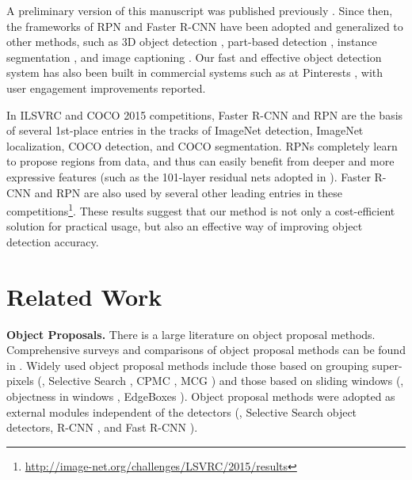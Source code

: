 \documentclass[10pt,journal,cspaper,compsoc]{IEEEtran}
\begin{document}
A preliminary version of this manuscript was published previously \cite{Ren2015a}. Since then, the frameworks of RPN and Faster R-CNN have been adopted and generalized to other methods, such as 3D object detection \cite{Song2015}, part-based detection \cite{Zhu2015}, instance segmentation \cite{Dai2015a}, and image captioning \cite{Johnson2015}. Our fast and effective object detection system has also been built in commercial systems such as at Pinterests \cite{Kislyuk2015}, with user engagement improvements reported.

In ILSVRC and COCO 2015 competitions, Faster R-CNN and RPN are the basis of several 1st-place entries \cite{He2015a} in the tracks of ImageNet detection, ImageNet localization, COCO detection, and COCO segmentation. RPNs completely learn to propose regions from data, and thus can easily benefit from deeper and more expressive features (such as the 101-layer residual nets adopted in \cite{He2015a}). Faster R-CNN and RPN are also used by several other leading entries in these competitions\footnote{\url{http://image-net.org/challenges/LSVRC/2015/results}}. These results suggest that our method is not only a cost-efficient solution for practical usage, but also an effective way of improving object detection accuracy.


\section{Related Work}

\noindent\textbf{Object Proposals.} There is a large literature on object proposal methods. Comprehensive surveys and comparisons of object proposal methods can be found in \cite{Hosang2014,Hosang2015,Chavali2015}. Widely used object proposal methods include those based on grouping super-pixels (\eg, Selective Search \cite{Uijlings2013}, CPMC \cite{Carreira2012}, MCG \cite{Arbelaez2014}) and those based on sliding windows (\eg, objectness in windows \cite{Alexe2012}, EdgeBoxes \cite{Zitnick2014}). Object proposal methods were adopted as external modules independent of the detectors (\eg, Selective Search \cite{Uijlings2013} object detectors, R-CNN \cite{Girshick2014}, and Fast R-CNN \cite{Girshick2015a}).
\end{document}
